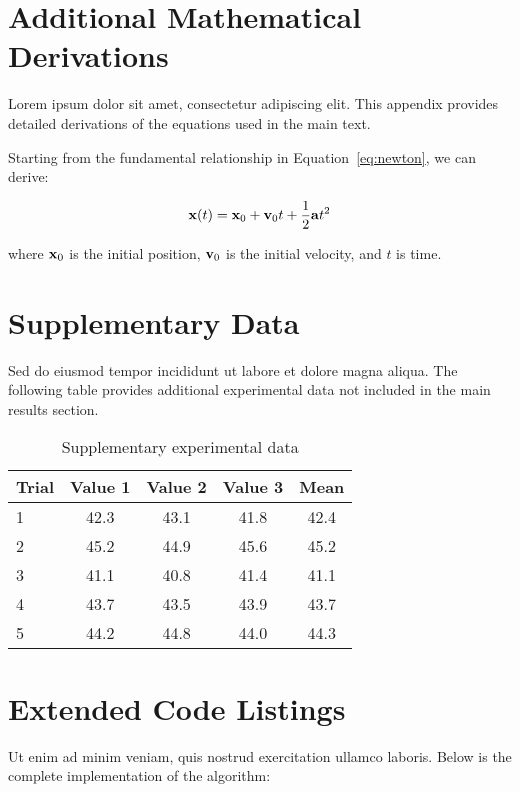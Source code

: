 \documentclass[../main.tex]{subfiles}
\begin{document}
\section{Additional Mathematical Derivations}

Lorem ipsum dolor sit amet, consectetur adipiscing elit. This appendix provides detailed derivations of the equations used in the main text.

Starting from the fundamental relationship in Equation~\ref{eq:newton}, we can derive:

\begin{equation}
    \mathbf{x}(t) = \mathbf{x}_0 + \mathbf{v}_0 t + \frac{1}{2}\mathbf{a}t^2
    \label{eq:position}
\end{equation}

where $\mathbf{x}_0$ is the initial position, $\mathbf{v}_0$ is the initial velocity, and $t$ is time.

\section{Supplementary Data}

Sed do eiusmod tempor incididunt ut labore et dolore magna aliqua. The following table provides additional experimental data not included in the main results section.

\begin{table}[H]
\centering
\caption{Supplementary experimental data}
\label{tab:supplementary}
\begin{tabular}{lcccc}
\hline
\textbf{Trial} & \textbf{Value 1} & \textbf{Value 2} & \textbf{Value 3} & \textbf{Mean} \\
\hline
1 & 42.3 & 43.1 & 41.8 & 42.4 \\
2 & 45.2 & 44.9 & 45.6 & 45.2 \\
3 & 41.1 & 40.8 & 41.4 & 41.1 \\
4 & 43.7 & 43.5 & 43.9 & 43.7 \\
5 & 44.2 & 44.8 & 44.0 & 44.3 \\
\hline
\end{tabular}
\end{table}

\section{Extended Code Listings}

Ut enim ad minim veniam, quis nostrud exercitation ullamco laboris. Below is the complete implementation of the algorithm:
\end{document}
